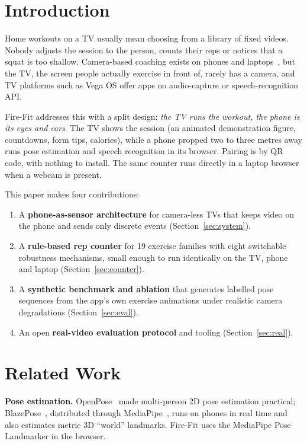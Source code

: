 \documentclass[conference]{IEEEtran}
\begin{document}
\section{Introduction}
Home workouts on a TV usually mean choosing from a library of fixed videos. Nobody
adjusts the session to the person, counts their reps or notices that a squat is too
shallow. Camera-based coaching exists on phones and laptops~\cite{chen2020posetrainer,fieraru2021aifit},
but the TV, the screen people actually exercise in front of, rarely has a camera, and
TV platforms such as Vega OS offer apps no audio-capture or speech-recognition API.

Fire-Fit addresses this with a split design: \emph{the TV runs the workout, the phone is
its eyes and ears}. The TV shows the session (an animated demonstration figure,
countdowns, form tips, calories), while a phone propped two to three metres away runs
pose estimation and speech recognition in its browser. Pairing is by QR code, with
nothing to install. The same counter runs directly in a laptop browser when a webcam
is present.

This paper makes four contributions:
\begin{enumerate}
\item A \textbf{phone-as-sensor architecture} for camera-less TVs that keeps video on
the phone and sends only discrete events (Section~\ref{sec:system}).
\item A \textbf{rule-based rep counter} for 19 exercise families with eight
switchable robustness mechanisms, small enough to run identically on the TV, phone and
laptop (Section~\ref{sec:counter}).
\item A \textbf{synthetic benchmark and ablation} that generates labelled pose
sequences from the app's own exercise animations under realistic camera degradations
(Section~\ref{sec:eval}).
\item An open \textbf{real-video evaluation protocol} and tooling (Section~\ref{sec:real}).
\end{enumerate}

\section{Related Work}
\textbf{Pose estimation.} OpenPose~\cite{cao2021openpose} made multi-person 2D pose
estimation practical; BlazePose~\cite{bazarevsky2020blazepose}, distributed through
MediaPipe~\cite{lugaresi2019mediapipe}, runs on phones in real time and also estimates
metric 3D ``world'' landmarks. Fire-Fit uses the MediaPipe Pose Landmarker in the browser.
\end{document}
